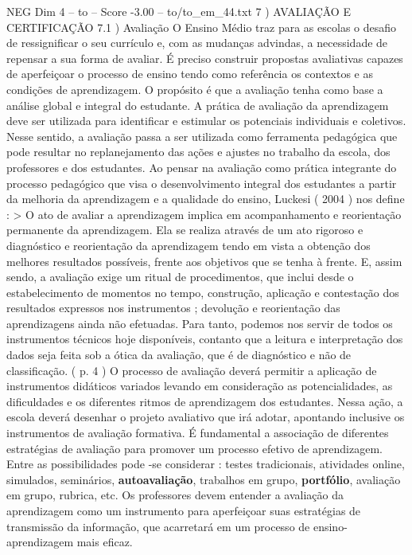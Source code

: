 \begin{textsample}{NEG Dim 4 – to – Score -3.00 – to/to\_em\_44.txt}  \label{ex:f4_neg_081}
7 ) AVALIAÇÃO E CERTIFICAÇÃO 7.1 ) Avaliação O Ensino Médio traz para as escolas o desafio de ressignificar o seu currículo e, com as mudanças advindas, a necessidade de repensar a sua forma de avaliar.
É preciso construir propostas avaliativas capazes de aperfeiçoar o processo de ensino tendo como referência os contextos e as condições de aprendizagem.
O propósito é que a avaliação tenha como base a análise global e integral do estudante.
A prática de avaliação da aprendizagem deve ser utilizada para identificar e estimular os potenciais individuais e coletivos.
Nesse sentido, a avaliação passa a ser utilizada como ferramenta pedagógica que pode resultar no replanejamento das ações e ajustes no trabalho da escola, dos professores e dos estudantes.
Ao pensar na avaliação como prática integrante do processo pedagógico que visa o desenvolvimento integral dos estudantes a partir da melhoria da aprendizagem e a qualidade do ensino, Luckesi ( 2004 ) nos define : > O ato de avaliar a aprendizagem implica em acompanhamento e reorientação permanente da aprendizagem.
Ela se realiza através de um ato rigoroso e diagnóstico e reorientação da aprendizagem tendo em vista a obtenção dos melhores resultados possíveis, frente aos objetivos que se tenha à frente.
E, assim sendo, a avaliação exige um ritual de procedimentos, que inclui desde o estabelecimento de momentos no tempo, construção, aplicação e contestação dos resultados expressos nos instrumentos ; devolução e reorientação das aprendizagens ainda não efetuadas.
Para tanto, podemos nos servir de todos os instrumentos técnicos hoje disponíveis, contanto que a leitura e interpretação dos dados seja feita sob a ótica da avaliação, que é de diagnóstico e não de classificação. ( p. 4 ) O processo de avaliação deverá permitir a aplicação de instrumentos didáticos variados levando em consideração as potencialidades, as dificuldades e os diferentes ritmos de aprendizagem dos estudantes.
Nessa ação, a escola deverá desenhar o projeto avaliativo que irá adotar, apontando inclusive os instrumentos de avaliação formativa.
É fundamental a associação de diferentes estratégias de avaliação para promover um processo efetivo de aprendizagem.
Entre as possibilidades pode -se considerar : testes tradicionais, atividades online, simulados, seminários, \textbf{autoavaliação}, trabalhos em grupo, \textbf{portfólio}, avaliação em grupo, rubrica, etc.
Os professores devem entender a avaliação da aprendizagem como um instrumento para aperfeiçoar suas estratégias de transmissão da informação, que acarretará em um processo de ensino-aprendizagem mais eficaz.

\end{textsample}
